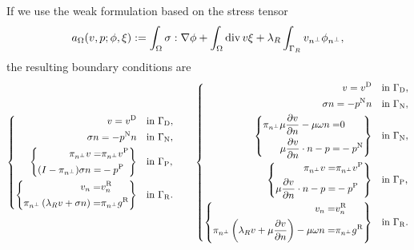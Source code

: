 \begin{proposition}\label{prop:}
If we use the weak formulation based on the stress tensor
%
\begin{equation}\label{eq:}
a_{\Omega}(v,p; \phi,\xi) := \int_{\Omega} \sigma:\nabla\phi + \int_{\Omega} \operatorname{div} v \xi
+ \lambda_R\int_{\Gamma_R}v_{{n^{\perp}}} \phi_{{n^{\perp}}},
\end{equation}
%
the resulting boundary conditions are 
%
\begin{equation}\label{eq:stokes:bccauchy}
%
\begin{aligned}
%
\left\{
\begin{aligned}
v = \vD \quad &\mbox{in $\GammaD$},\\
\sigma n= -\pN n\quad &\mbox{in $\GammaN$},\\
\left\{
\begin{aligned}
\pitang v =& \pitang \vP\\
(I-\pitang) \sigma n  =& -\pP 
\end{aligned}
\right\}
\quad &\mbox{in $\GammaP$},\\
\left\{
\begin{aligned}
v_n =& \vRn\\
\pitang \left( \lambda_R v + \sigma n\right)  =& \pitang\gR 
\end{aligned}
\right\}
\quad &\mbox{in $\GammaR$}.
\end{aligned}
\right.
%
\qquad
\left\{
\begin{aligned}
v = \vD \quad &\mbox{in $\GammaD$},\\
\sigma n= -\pN n\quad &\mbox{in $\GammaN$},\\
\left\{
\begin{aligned}
\pitang \mu \frac{\partial v}{\partial n} - \mu\omega n  =& 0\\
 \mu \frac{\partial v}{\partial n}\cdot n -p   =& -\pN
\end{aligned}
\right\}
\quad &\mbox{in $\GammaN$},\\
\left\{
\begin{aligned}
\pitang v =& \pitang \vP\\
 \mu \frac{\partial v}{\partial n}\cdot n -p   =& -\pP
\end{aligned}
\right\}
\quad &\mbox{in $\GammaP$},\\
\left\{
\begin{aligned}
v_n =& \vRn\\
\pitang \left( \lambda_R v +\mu \dn{v}\right) - \mu\omega n  =& \pitang\gR 
\end{aligned}
\right\}
\quad &\mbox{in $\GammaR$}.
\end{aligned}
\right.
%
\end{aligned}
\end{equation}
%
\end{proposition}
